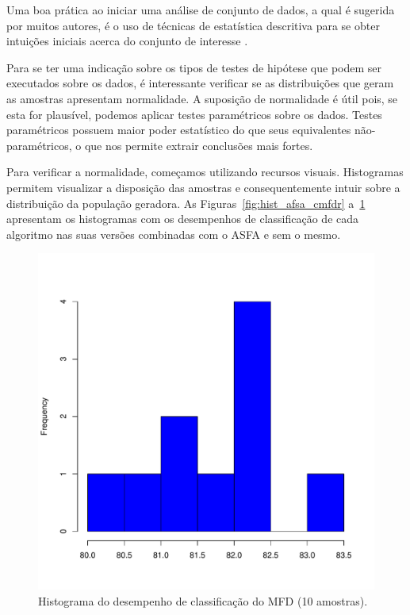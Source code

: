 \documentclass[conference]{IEEEtran}
\begin{document}
Uma boa prática ao iniciar uma análise de conjunto de dados, a qual é sugerida por muitos autores, é o uso de técnicas de estatística descritiva para se obter intuições iniciais acerca do conjunto de interesse \cite{montgomery2010applied}.

Para se ter uma indicação sobre os tipos de testes de hipótese que podem ser executados sobre os dados, é interessante verificar se as distribuições que geram as amostras apresentam normalidade.
A suposição de normalidade é útil pois, se esta for plausível, podemos aplicar testes paramétricos sobre os dados.
Testes paramétricos possuem maior poder estatístico do que seus equivalentes não-paramétricos, o que nos permite extrair conclusões mais fortes.

Para verificar a normalidade, começamos utilizando recursos visuais.
Histogramas permitem visualizar a disposição das amostras e consequentemente intuir sobre a distribuição da população geradora.
As Figuras~\ref{fig:hist_afsa_cmfdr} a~\ref{fig:hist_mfd} apresentam os histogramas com os desempenhos de classificação de cada algoritmo  nas suas versões combinadas com o ASFA e sem o mesmo.

\begin{figure}[h]
	\centering
	\includegraphics[width=\linewidth]{img/bluehist_mfd.pdf}
	\caption{Histograma do desempenho de classificação do MFD (10 amostras).}
	\label{fig:hist_mfd}
\end{figure}
\end{document}
